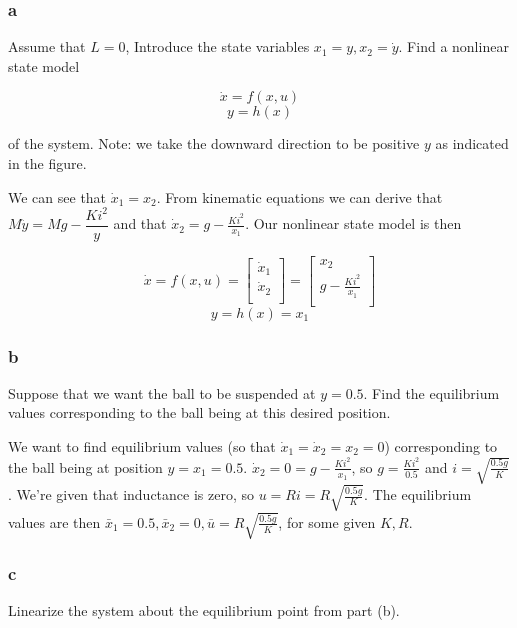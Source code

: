 \documentclass[11pt]{article}
\begin{document}
\subsubsection{a}

Assume that $L = 0$, Introduce the state variables $x_1 = y, x_2 = \dot y$. Find a nonlinear state model

\[ \dot x = f(x, u) \]
\[ y = h(x) \]

of the system. Note: we take the downward direction to be positive $y$ as indicated in the figure.

We can see that $\dot x_1 = x_2$. From kinematic equations we can derive that $M \ddot y = Mg - \dfrac{Ki^2}{y}$ and that $\dot x_2 = g - \frac{Ki^2}{x_1}$. Our nonlinear state model is then

\[
    \dot x = f(x, u) =
    \begin{bmatrix}
        \dot x_1 \\
        \dot x_2 \\
    \end{bmatrix}
    =
    \begin{bmatrix}
        x_2 \\
        g - \frac{Ki^2}{x_1} \\
    \end{bmatrix}
\]
\[ y = h(x) = x_1 \]

\subsubsection{b}

Suppose that we want the ball to be suspended at $y = 0.5$. Find the equilibrium values corresponding to the ball being at this desired position.

We want to find equilibrium values (so that $\dot x_1 = \dot x_2 = x_2 = 0$) corresponding to the ball being at position $y = x_1 = 0.5$. $\dot x_2 = 0 = g - \frac{Ki^2}{x_1}$, so $g = \frac{Ki^2}{0.5}$ and $i = \sqrt{\frac{0.5g}{K}}$. We're given that inductance is zero, so $u = Ri = R \sqrt{\frac{0.5g}{K}}$. The equilibrium values are then $\bar x_1 = 0.5, \bar x_2 = 0, \bar u = R \sqrt{\frac{0.5g}{K}}$, for some given $K, R$.

\subsubsection{c}

Linearize the system about the equilibrium point from part (b).
\end{document}
